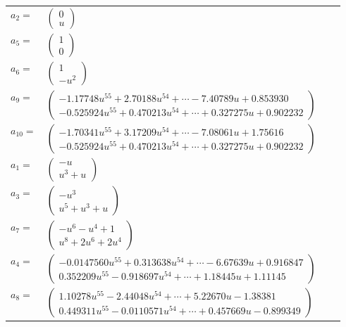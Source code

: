 \documentclass[1p]{elsarticle_modified}
\theoremstyle{definition}
\begin{document}
\begin{tabular}{m{7pt} m{180pt} m{7pt} m{180pt} }
\flushright $a_{2}=$&$\begin{pmatrix}0\\u\end{pmatrix}$ \\
\flushright $a_{5}=$&$\begin{pmatrix}1\\0\end{pmatrix}$ \\
\flushright $a_{6}=$&$\begin{pmatrix}1\\- u^2\end{pmatrix}$ \\
\flushright $a_{9}=$&$\begin{pmatrix}-1.17748 u^{55}+2.70188 u^{54}+\cdots-7.40789 u+0.853930\\-0.525924 u^{55}+0.470213 u^{54}+\cdots+0.327275 u+0.902232\end{pmatrix}$ \\
\flushright $a_{10}=$&$\begin{pmatrix}-1.70341 u^{55}+3.17209 u^{54}+\cdots-7.08061 u+1.75616\\-0.525924 u^{55}+0.470213 u^{54}+\cdots+0.327275 u+0.902232\end{pmatrix}$ \\
\flushright $a_{1}=$&$\begin{pmatrix}- u\\u^3+u\end{pmatrix}$ \\
\flushright $a_{3}=$&$\begin{pmatrix}- u^3\\u^5+u^3+u\end{pmatrix}$ \\
\flushright $a_{7}=$&$\begin{pmatrix}- u^6- u^4+1\\u^8+2 u^6+2 u^4\end{pmatrix}$ \\
\flushright $a_{4}=$&$\begin{pmatrix}-0.0147560 u^{55}+0.313638 u^{54}+\cdots-6.67639 u+0.916847\\0.352209 u^{55}-0.918697 u^{54}+\cdots+1.18445 u+1.11145\end{pmatrix}$ \\
\flushright $a_{8}=$&$\begin{pmatrix}1.10278 u^{55}-2.44048 u^{54}+\cdots+5.22670 u-1.38381\\0.449311 u^{55}-0.0110571 u^{54}+\cdots+0.457669 u-0.899349\end{pmatrix}$ \\

\end{tabular}
\end{document}
